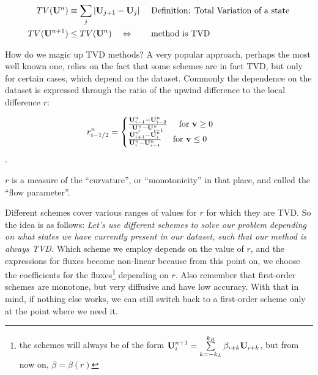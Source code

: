 \begin{align}
	TV(\U^n) &\equiv \sum_j | \U_{j+1} - \U_j | && \text{ Definition: Total Variation of a state}\\
	TV(\U^{n+1}) &\leq TV(\U^n) \quad \Leftrightarrow && \text{ method is TVD }
\end{align}


How do we magic up TVD methods?
A very popular approach, perhaps the most well known one, relies on the fact that some schemes are in fact TVD, but only for certain cases, which depend on the dataset.
Commonly the dependence on the dataset is expressed through the ratio of the upwind difference to the local difference $r$:

\begin{align*}
	r^n_{i-1/2} &= \begin{cases}
		\frac{\mathbf{U}_{i-1}^n - \mathbf{U}_{i-2}^n}{\mathbf{U}_{i}^n - \mathbf{U}_{i-1}^n} 	\quad \text{ for } \mathbf{v}  \geq 0 \\
		\frac{\mathbf{U}_{i+1}^n - \mathbf{U}_{i}^n}{\mathbf{U}_{i}^n - \mathbf{U}_{i-1}^n} 	\quad \text{ for } \mathbf{v}  \leq 0 \\
	\end{cases}
\end{align*}.

$r$ is  a measure of the ``curvature'', or ``monotonicity'' in that place, and called the ``flow parameter''.

Different schemes cover various ranges of values for $r$ for which they are TVD.
So the idea is as follows:
\emph{Let's use different schemes to solve our problem depending on what states we have currently present in our dataset, such that our method is always TVD.}
Which scheme we employ depends on the value of $r$, and the expressions for fluxes become non-linear because from this point on, we choose the coefficients for the fluxes\footnote{	
	the schemes will always be of the form $\U^{n+1}_i = \sum_{k = -k_L}^{k_R} \beta_{i+k} \U_{i+k}$, but from now on, $\beta = \beta(r)$
} depending on $r$.
Also remember that first-order schemes are monotone, but very diffusive and have low accuracy.
With that in mind, if nothing else works, we can still switch back to a first-order scheme only at the point where we need it.



















